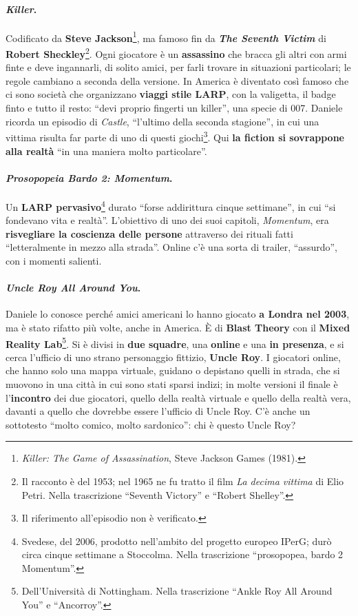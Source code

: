 \paragraph{\emph{Killer}.} Codificato da \textbf{Steve Jackson}\footnote{\emph{Killer: The Game of
Assassination}, Steve Jackson Games (1981).}, ma famoso fin da \textbf{\emph{The Seventh
Victim}} di \textbf{Robert Sheckley}\footnote{Il racconto è del 1953; nel 1965 ne fu tratto il
film \emph{La decima vittima} di Elio Petri. Nella trascrizione ``Seventh Victory'' e ``Robert
Shelley''.}. Ogni giocatore è un \textbf{assassino} che bracca gli altri con armi finte e deve
ingannarli, di solito amici, per farli trovare in situazioni particolari; le regole cambiano a
seconda della versione. In America è diventato così famoso che ci sono società che organizzano
\textbf{viaggi stile LARP}, con la valigetta, il badge finto e tutto il resto: ``devi proprio
fingerti un killer'', una specie di 007. Daniele ricorda un episodio di \emph{Castle}, ``l'ultimo
della seconda stagione'', in cui una vittima risulta far parte di uno di questi giochi\footnote{Il
riferimento all'episodio non è verificato.}. Qui \textbf{la fiction si sovrappone alla realtà}
``in una maniera molto particolare''.

\paragraph{\emph{Prosopopeia Bardo 2: Momentum}.} Un \textbf{LARP pervasivo}\footnote{Svedese, del
2006, prodotto nell'ambito del progetto europeo IPerG; durò circa cinque settimane a Stoccolma.
Nella trascrizione ``prosopopea, bardo 2 Momentum''.} durato ``forse addirittura cinque
settimane'', in cui ``si fondevano vita e realtà''. L'obiettivo di uno dei suoi capitoli,
\emph{Momentum}, era \textbf{risvegliare la coscienza delle persone} attraverso dei rituali fatti
``letteralmente in mezzo alla strada''. Online c'è una sorta di trailer, ``assurdo'', con i
momenti salienti.

\paragraph{\emph{Uncle Roy All Around You}.} Daniele lo conosce perché amici americani lo hanno
giocato \textbf{a Londra nel 2003}, ma è stato rifatto più volte, anche in America. È di
\textbf{Blast Theory} con il \textbf{Mixed Reality Lab}\footnote{Dell'Università di Nottingham.
Nella trascrizione ``Ankle Roy All Around You'' e ``Ancorroy''.}. Si è divisi in \textbf{due
squadre}, una \textbf{online} e una \textbf{in presenza}, e si cerca l'ufficio di uno strano
personaggio fittizio, \textbf{Uncle Roy}. I giocatori online, che hanno solo una mappa virtuale,
guidano o depistano quelli in strada, che si muovono in una città in cui sono stati sparsi
indizi; in molte versioni il finale è l'\textbf{incontro} dei due giocatori, quello della realtà
virtuale e quello della realtà vera, davanti a quello che dovrebbe essere l'ufficio di Uncle Roy.
C'è anche un sottotesto ``molto comico, molto sardonico'': chi è questo Uncle Roy?

